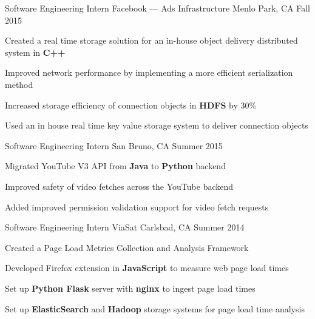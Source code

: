\begin{cventries}

\cventry
{Software Engineering Intern} %
{{\color{facebookblue}Facebook} --- Ads Infrastructure} %
{Menlo Park, CA} %
{Fall 2015} %
{ %
\begin{cvitems}
\item {Created a real time storage solution for an in-house object delivery distributed system in \textbf{C++}}
\item {Improved network performance by implementing a more efficient serialization method}
\item {Increased storage efficiency of connection objects in \textbf{HDFS} by 30\%}
\item {Used an in house real time key value storage system to deliver connection objects}
\end{cvitems}
}


\cventry
{Software Engineering Intern} %
{\google}%
{San Bruno, CA} %
{Summer 2015} %
{ %
\begin{cvitems}
\item {Migrated YouTube V3 API from \textbf{Java} to \textbf{Python} backend}
\item {Improved safety of video fetches across the YouTube backend}
\item {Added improved permission validation support for video fetch requests}
\end{cvitems} 
}


\cventry
{Software Engineering Intern} %
{ViaSat} %
{Carlsbad, CA} %
{Summer 2014} %
{ %
\begin{cvitems}
\item {Created a Page Load Metrics Collection and Analysis Framework}
\item {Developed Firefox extension in \textbf{JavaScript} to measure web page load times}
\item {Set up \textbf{Python Flask} server with \textbf{nginx} to ingest page load times}
\item {Set up \textbf{ElasticSearch} and \textbf{Hadoop} storage systems for page load time analysis}
\end{cvitems}
}


\end{cventries}

